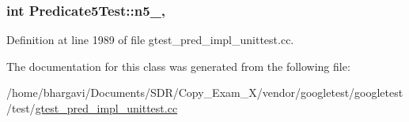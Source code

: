 \subsubsection[{\texorpdfstring{n5\+\_\+}{n5_}}]{\setlength{\rightskip}{0pt plus 5cm}int Predicate5\+Test\+::n5\+\_\+\hspace{0.3cm}{\ttfamily [static]}, {\ttfamily [protected]}}\hypertarget{class_predicate5_test_a96badba6366235a2771b27ea014bd9ce}{}\label{class_predicate5_test_a96badba6366235a2771b27ea014bd9ce}


Definition at line 1989 of file gtest\+\_\+pred\+\_\+impl\+\_\+unittest.\+cc.



The documentation for this class was generated from the following file\+:\begin{DoxyCompactItemize}
\item 
/home/bhargavi/\+Documents/\+S\+D\+R/\+Copy\+\_\+\+Exam\+\_\+X/vendor/googletest/googletest/test/\hyperlink{gtest__pred__impl__unittest_8cc}{gtest\+\_\+pred\+\_\+impl\+\_\+unittest.\+cc}\end{DoxyCompactItemize}
